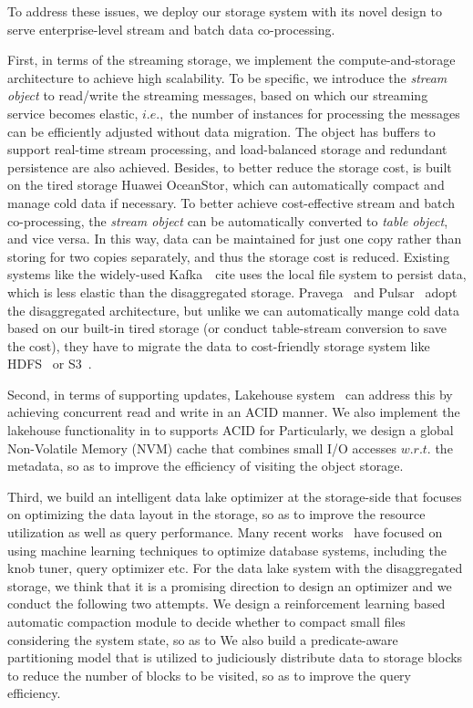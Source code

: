 To address these issues, we deploy our \sys storage system with its novel design to serve enterprise-level  stream and batch data co-processing.


First, in terms of the streaming storage, we implement the compute-and-storage  architecture to achieve high scalability. To be specific, 
 we introduce the \textit{stream object}  to read/write the streaming messages, based on which our streaming service becomes elastic, $i.e.,$ the number of instances for processing the messages can be efficiently adjusted without data migration. The object has buffers to support real-time stream processing, and load-balanced storage and redundant persistence are also achieved. 
Besides, to better reduce the storage cost,  \sys is built on the tired storage Huawei OceanStor, which can automatically compact and manage cold data if necessary.
To better achieve cost-effective stream and batch co-processing, the \textit{stream object}  can be automatically converted  to  \textit{table object}, and vice versa. In this way, data can be maintained for just one copy rather than storing for two copies separately, and thus the storage cost is reduced. 
Existing systems like the widely-used Kafka~\ cite{} uses the local file system to persist data, which is less elastic than the disaggregated storage.  Pravega~\cite{} and Pulsar~\cite{} adopt the 
disaggregated architecture, but unlike we can automatically mange cold data based on our built-in tired storage (or conduct table-stream conversion to save the cost), they have to migrate the data to  cost-friendly storage system like  HDFS~\cite{} or S3~\cite{}.




Second, in terms of supporting updates, Lakehouse system~\cite{} can address this by achieving concurrent read and write in an ACID manner. We also implement the lakehouse functionality in \sys to supports ACID for  Particularly, we design a global Non-Volatile Memory (NVM) cache that combines small I/O accesses $w.r.t.$ the metadata, so as to improve the efficiency of visiting the object storage.

Third,  we build an intelligent data lake optimizer \brain at the storage-side that focuses on optimizing the data layout in the storage, so as to improve the resource utilization as well as  query performance. Many recent works~\cc{}  have focused on using machine learning techniques to  optimize database systems, including the knob tuner, query optimizer etc. For the data lake system with the disaggregated storage, we think that it is a promising direction to design an optimizer and we conduct the following two attempts.
 We design a reinforcement learning based automatic compaction module  to decide whether to compact small files considering the system state, so as to  We also build a predicate-aware partitioning model that is utilized to judiciously distribute data to storage blocks to reduce the number of blocks to be visited, so as to improve the query efficiency.  

